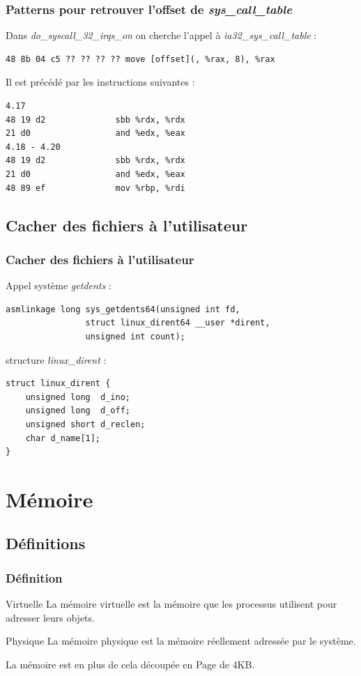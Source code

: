 \documentclass{beamer}
\begin{document}
\begin{frame}[fragile]
\frametitle{Patterns pour retrouver l'offset de \textit{sys\_call\_table}}
Dans \textit{do\_syscall\_32\_irqs\_on} on cherche l'appel à \textit{ia32\_sys\_call\_table} :
\begin{lstlisting}[style=CStyle]
48 8b 04 c5 ?? ?? ?? ?? move [offset](, %rax, 8), %rax
\end{lstlisting}
\medskip
Il est précédé par les instructions suivantes :
\begin{lstlisting}[style=CStyle]
4.17  
48 19 d2              sbb %rdx, %rdx  
21 d0                 and %edx, %eax  
4.18 - 4.20  
48 19 d2              sbb %rdx, %rdx  
21 d0                 and %edx, %eax  
48 89 ef              mov %rbp, %rdi  
\end{lstlisting}
\end{frame}
\subsection{Cacher des fichiers à l'utilisateur}
\begin{frame}[fragile]
\frametitle{Cacher des fichiers à l'utilisateur}
Appel système \textit{getdents} :
\begin{lstlisting}[style=CStyle]
asmlinkage long sys_getdents64(unsigned int fd,
				struct linux_dirent64 __user *dirent,
				unsigned int count);
\end{lstlisting}
\medskip
structure \textit{linux\_dirent} :
\begin{lstlisting}[style=CStyle]
 struct linux_dirent {
	unsigned long  d_ino;
	unsigned long  d_off;
	unsigned short d_reclen;
	char d_name[1]; 
}
\end{lstlisting}
\end{frame}

\section{Mémoire}
\subsection{Définitions}

\begin{frame}
\frametitle{Définition}
\begin{block}{Virtuelle}
La mémoire virtuelle est la mémoire que les processus utilisent pour adresser leurs objets.
\end{block}
\begin{block}{Physique}
La mémoire physique est la mémoire réellement adressée par le système.
\end{block}
\medskip
La mémoire est en plus de cela découpée en Page de 4KB.
\end{frame}
\end{document}
